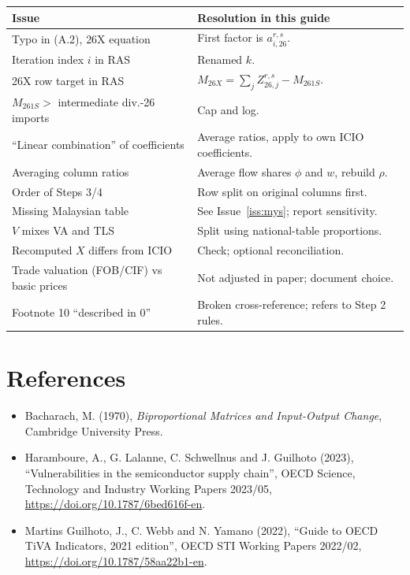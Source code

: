 \documentclass[11pt,a4paper]{article}
\theoremstyle{remark}
\theoremstyle{definition}
\newcommand{\sem}{{261S}}   %
\newcommand{\oth}{{26X}}    %
\newcommand{\agg}{{26}}     %
\begin{document}
\begin{center}
\begin{tabular}{@{}p{}p{}@{}}
\toprule
Issue & Resolution in this guide \\
\midrule
Typo in (A.2), \oth{} equation & First factor is $a^{r,s}_{i,\agg}$. \\
Iteration index $i$ in RAS & Renamed $k$. \\
\oth{} row target in RAS & $M_\oth = \sum_j Z^{r,s}_{\agg,j} - M_\sem$. \\
$M_\sem >$ intermediate div.-26 imports & Cap and log. \\
``Linear combination'' of coefficients & Average ratios, apply to own ICIO coefficients. \\
Averaging column ratios & Average flow shares $\phi$ and $w$, rebuild $\rho$. \\
Order of Steps 3/4 & Row split on original columns first. \\
Missing Malaysian table & See Issue~\ref{iss:mys}; report sensitivity. \\
$V$ mixes VA and TLS & Split using national-table proportions. \\
Recomputed $X$ differs from ICIO & Check; optional reconciliation. \\
Trade valuation (FOB/CIF) vs basic prices & Not adjusted in paper; document choice. \\
Footnote 10 ``described in 0'' & Broken cross-reference; refers to Step 2 rules. \\
\bottomrule
\end{tabular}
\end{center}

\section*{References}
\begin{itemize}[nosep,leftmargin=*]
  \item Bacharach, M. (1970), \emph{Biproportional Matrices and Input-Output Change}, Cambridge University Press.
  \item Haramboure, A., G. Lalanne, C. Schwellnus and J. Guilhoto (2023), ``Vulnerabilities in the semiconductor
        supply chain'', OECD Science, Technology and Industry Working Papers 2023/05, \url{https://doi.org/10.1787/6bed616f-en}.
  \item Martins Guilhoto, J., C. Webb and N. Yamano (2022), ``Guide to OECD TiVA Indicators, 2021 edition'',
        OECD STI Working Papers 2022/02, \url{https://doi.org/10.1787/58aa22b1-en}.
\end{itemize}
\end{document}
